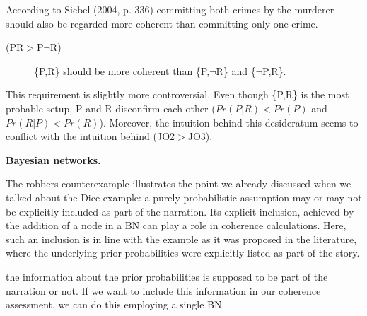 \documentclass[
  10pt,
]{scrartcl}
\newcommand{\s}[1]{\textsf{#1}}
\begin{document}
According to Siebel (2004, p. 336) committing both crimes by the murderer should also be regarded more coherent than committing only one crime.
\vspace{2mm}

\begin{description}
    \item[(\s{PR}$>$\s{P}$\neg$\s{R})] \{\s{P,R}\} should be more coherent than \{\s{P},$\neg$\s{R}\} and \{$\neg$\s{P},\s{R}\}.
\end{description}\vspace{2mm}

\noindent  This requirement is slightly more controversial. Even though \{\s{P,R}\} is the most probable setup, \s{P} and \s{R} disconfirm each other (\(Pr(P|R)<Pr(P)\) and \(Pr(R|P)<Pr(R)\)). Moreover, the intuition behind this desideratum seems to conflict with the intuition behind (\s{JO2}\(>\)\s{JO3}).

\textbf{Bayesian networks.}

The robbers counterexample illustrates the point we already discussed when we talked about the Dice example: a purely probabilistic assumption may or may not be explicitly included as part of the narration. Its explicit inclusion, achieved by the addition of a node in a BN can play a role in coherence calculations. Here, such an inclusion is in line with the example as it was proposed in the literature, where the underlying prior probabilities were explicitly listed as part of the story.

the information about the prior probabilities is supposed to be part of the narration or not.  If we want to include this information in our coherence assessment, we can do this employing a single BN.

\vspace{1mm}
\footnotesize
\end{document}
